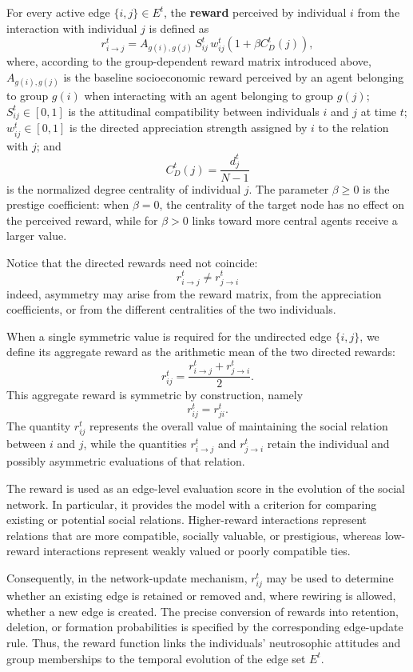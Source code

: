\documentclass[11pt,a4paper]{article}
\begin{document}
For every active edge $\{i,j\}\in E^t$, the \textbf{reward} perceived by individual $i$
from the interaction with individual $j$ is defined as
\[
r_{i\to j}^t
=
A_{g(i),g(j)}\,S_{ij}^t\,w_{ij}^t
\left(1+\beta C_D^t(j)\right),
\]
where, according to the group-dependent reward matrix introduced above,
$A_{g(i),g(j)}$ is the baseline socioeconomic reward perceived by an agent
belonging to group $g(i)$ when interacting with an agent belonging to group
$g(j)$; $S_{ij}^t\in[0,1]$ is the attitudinal compatibility between individuals
$i$ and $j$ at time $t$; $w_{ij}^t\in[0,1]$ is the directed appreciation strength
assigned by $i$ to the relation with $j$; and
\[
C_D^t(j)=\frac{d_j^t}{N-1}
\]
is the normalized degree centrality of individual $j$. The parameter
$\beta\geq 0$ is the prestige coefficient: when $\beta=0$, the centrality of the
target node has no effect on the perceived reward, while for $\beta>0$ links
toward more central agents receive a larger value.

	Notice that the directed rewards need not coincide:
	$$
	r_{i\to j}^t\neq r_{j\to i}^t
	$$
	indeed, asymmetry may arise from the reward matrix, from the appreciation coefficients, or from the different centralities of the two individuals.
	
	When a single symmetric value is required for the undirected edge $\{i,j\}$, we define its aggregate reward as the arithmetic mean of the two directed rewards:
	$$
	r_{ij}^t
	=
	\frac{r_{i\to j}^t+r_{j\to i}^t}{2}.
	$$
	This aggregate reward is symmetric by construction, namely
	$$
	r_{ij}^t=r_{ji}^t.
	$$
	The quantity $r_{ij}^t$ represents the overall value of maintaining the social relation between $i$ and $j$, while the quantities $r_{i\to j}^t$ and $r_{j\to i}^t$ retain the individual and possibly asymmetric evaluations of that relation.
	
	The reward is used as an edge-level evaluation score in the evolution of the social network. In particular, it provides the model with a criterion for comparing existing or potential social relations.
	Higher-reward interactions represent relations that are more compatible, socially valuable, or prestigious, whereas low-reward interactions represent weakly valued or poorly compatible ties.
	
	Consequently, in the network-update mechanism, $r_{ij}^t$ may be used to determine whether an existing edge is retained or removed and, where rewiring is allowed, whether a new edge is created. The precise conversion of rewards into retention, deletion, or formation probabilities is specified by the corresponding edge-update rule.
	Thus, the reward function links the individuals' neutrosophic attitudes and group memberships to the temporal evolution of the edge set $E^t$.
\end{document}
